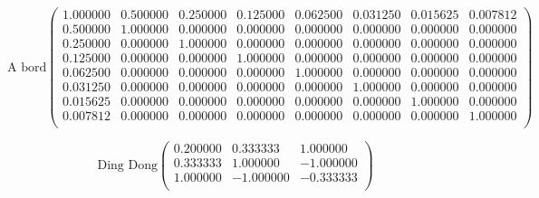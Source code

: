 \documentclass{report}
\begin{document}
      \begin{equation}
	\textrm{A bord}
	\begin{pmatrix}
	  1.000000 & 0.500000 & 0.250000 & 0.125000 & 0.062500 & 0.031250 & 0.015625 & 0.007812 \\ 
	  0.500000 & 1.000000 & 0.000000 & 0.000000 & 0.000000 & 0.000000 & 0.000000 & 0.000000 \\ 
	  0.250000 & 0.000000 & 1.000000 & 0.000000 & 0.000000 & 0.000000 & 0.000000 & 0.000000 \\ 
	  0.125000 & 0.000000 & 0.000000 & 1.000000 & 0.000000 & 0.000000 & 0.000000 & 0.000000 \\ 
	  0.062500 & 0.000000 & 0.000000 & 0.000000 & 1.000000 & 0.000000 & 0.000000 & 0.000000 \\ 
	  0.031250 & 0.000000 & 0.000000 & 0.000000 & 0.000000 & 1.000000 & 0.000000 & 0.000000 \\ 
	  0.015625 & 0.000000 & 0.000000 & 0.000000 & 0.000000 & 0.000000 & 1.000000 & 0.000000 \\ 
	  0.007812 & 0.000000 & 0.000000 & 0.000000 & 0.000000 & 0.000000 & 0.000000 & 1.000000 \\ 
	\end{pmatrix}
	\label{syst2}
      \end{equation}
      
      \begin{equation}
	\textrm{Ding Dong}
	\begin{pmatrix}
	  0.200000 & 0.333333 & 1.000000 \\ 
	  0.333333 & 1.000000 & -1.000000 \\ 
	  1.000000 & -1.000000 & -0.333333 \\ 
	\end{pmatrix}
	\label{syst3}
      \end{equation}
      
\end{document}

